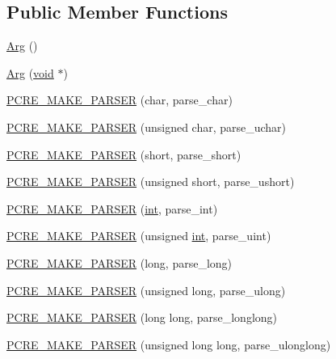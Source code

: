 \subsection*{Public Member Functions}
\begin{DoxyCompactItemize}
\item 
\hyperlink{classpcrecpp_1_1Arg_a92c21f5bfd51f4f16ab8ec83d843f352}{Arg} ()
\item 
\hyperlink{classpcrecpp_1_1Arg_a33a817ef6ce54fc0a8a1915635e45b7b}{Arg} (\hyperlink{group__MOD__ISAPI_gacd6cdbf73df3d9eed42fa493d9b621a6}{void} $\ast$)
\item 
\hyperlink{classpcrecpp_1_1Arg_aff01edb3dc746ce27ed86b60827b6b70}{P\+C\+R\+E\+\_\+\+M\+A\+K\+E\+\_\+\+P\+A\+R\+S\+ER} (char, parse\+\_\+char)
\item 
\hyperlink{classpcrecpp_1_1Arg_a94d8fd4438fbb073ee0571e326b4f767}{P\+C\+R\+E\+\_\+\+M\+A\+K\+E\+\_\+\+P\+A\+R\+S\+ER} (unsigned char, parse\+\_\+uchar)
\item 
\hyperlink{classpcrecpp_1_1Arg_a3f3bc5ce34c3af5060d3e399896e2069}{P\+C\+R\+E\+\_\+\+M\+A\+K\+E\+\_\+\+P\+A\+R\+S\+ER} (short, parse\+\_\+short)
\item 
\hyperlink{classpcrecpp_1_1Arg_a0829daf28b1bd94fff75d28b96ea1836}{P\+C\+R\+E\+\_\+\+M\+A\+K\+E\+\_\+\+P\+A\+R\+S\+ER} (unsigned short, parse\+\_\+ushort)
\item 
\hyperlink{classpcrecpp_1_1Arg_ae3462c63d9d013e23c0c0506801daf13}{P\+C\+R\+E\+\_\+\+M\+A\+K\+E\+\_\+\+P\+A\+R\+S\+ER} (\hyperlink{pcre_8txt_a42dfa4ff673c82d8efe7144098fbc198}{int}, parse\+\_\+int)
\item 
\hyperlink{classpcrecpp_1_1Arg_a4bdea759fafd209c70a2df4aed70235b}{P\+C\+R\+E\+\_\+\+M\+A\+K\+E\+\_\+\+P\+A\+R\+S\+ER} (unsigned \hyperlink{pcre_8txt_a42dfa4ff673c82d8efe7144098fbc198}{int}, parse\+\_\+uint)
\item 
\hyperlink{classpcrecpp_1_1Arg_af1a7778b46b4ef3d14f1528e86000301}{P\+C\+R\+E\+\_\+\+M\+A\+K\+E\+\_\+\+P\+A\+R\+S\+ER} (long, parse\+\_\+long)
\item 
\hyperlink{classpcrecpp_1_1Arg_ae605ad0824d0e746296a127064443ed1}{P\+C\+R\+E\+\_\+\+M\+A\+K\+E\+\_\+\+P\+A\+R\+S\+ER} (unsigned long, parse\+\_\+ulong)
\item 
\hyperlink{classpcrecpp_1_1Arg_a179213f45835157ab14769b8c9f5b028}{P\+C\+R\+E\+\_\+\+M\+A\+K\+E\+\_\+\+P\+A\+R\+S\+ER} (long long, parse\+\_\+longlong)
\item 
\hyperlink{classpcrecpp_1_1Arg_abd6043d5039e0211d6ac9f8dac57b664}{P\+C\+R\+E\+\_\+\+M\+A\+K\+E\+\_\+\+P\+A\+R\+S\+ER} (unsigned long long, parse\+\_\+ulonglong)

\end{DoxyCompactItemize}
